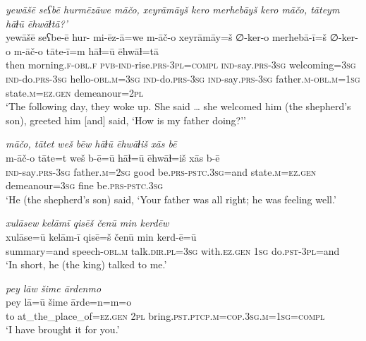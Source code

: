\ea \label{KŠ.81}
\textit{yewāšē seʕbē hurmēzāwe māčo, xeyrāmāyš kero merhebāyš kero māčo, tāteym hāɫū ēhwāɫtā?’} \\ 
\gll yewāšē seʕbe-ē hur- mi-ēz-ā=we m-āč-o xeyrāmāy=š ∅-ker-o merhebā-ī=š ∅-ker-o m-āč-o tāte-ī=m hāɫ=ū ēhwāɫ=tā \\ 
 then morning\textsc{.f}\textsc{-obl}\textsc{.f} \textsc{pvb-}\textsc{ind-}rise\textsc{.prs}\textsc{-3pl}\textsc{=compl} \textsc{ind-}say\textsc{.prs}\textsc{-3sg} welcoming\textsc{=3sg} \textsc{ind-}do\textsc{.prs}\textsc{-3sg} hello\textsc{-obl}\textsc{.m}\textsc{=3sg} \textsc{ind-}do\textsc{.prs}\textsc{-3sg} \textsc{ind-}say\textsc{.prs}\textsc{-3sg} father\textsc{.m}\textsc{-obl}\textsc{.m}\textsc{=\textsc{1sg}} state\textsc{.m}\textsc{\textsc{=ez.gen}} demeanour=\textsc{2pl} \\ 
\glt `The following day, they woke up. She said … she welcomed him (the shepherd’s son), greeted him [and] said, ‘How is my father doing?’'
\z 
 
\ea \label{KŠ.82}
\textit{māčo, tātet weš bēw hāɫū ēhwāɫiš xās bē} \\ 
\gll m-āč-o tāte=t weš b-ē=ū hāɫ=ū ēhwāɫ=iš xās b-ē \\ 
 \textsc{ind-}say\textsc{.prs}\textsc{-3sg} father\textsc{.m}\textsc{=\textsc{2sg}} good be\textsc{.prs}\textsc{-pstc}\textsc{.3sg}=and state\textsc{.m}\textsc{\textsc{=ez.gen}} demeanour\textsc{=3sg} fine be\textsc{.prs}\textsc{-pstc}\textsc{.3sg} \\ 
\glt `He (the shepherd’s son) said, ‘Your father was all right; he was feeling well.'
\z 
 
\ea \label{KŠ.83}
\textit{xulāsew kelāmī qisēš čenū min kerdēw} \\ 
\gll xulāse=ū kelām-ī qisē=š čenū min kerd-ē=ū \\ 
 summary=and speech\textsc{-obl}\textsc{.m} talk\textsc{.dir}\textsc{.pl}\textsc{=3sg} with\textsc{\textsc{.ez}.gen} \textsc{1sg} do\textsc{.pst}\textsc{-3pl}=and \\ 
\glt `In short, he (the king) talked to me.'
\z 
 
\ea \label{KŠ.85}
\textit{pey lāw šime ārdenmo} \\ 
\gll pey lā=ū šime ārde=n=m=o \\ 
 to at\_the\_place\_of\textsc{\textsc{=ez.gen}} \textsc{2pl} bring\textsc{.pst}\textsc{.ptcp}\textsc{.m}\textsc{=cop}\textsc{.3sg}\textsc{.m}\textsc{=\textsc{1sg}}\textsc{=compl} \\ 
\glt `I have brought it for you.'
\z 
 
